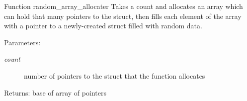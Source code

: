 Function random\_\-array\_\-allocater Takes a count and allocates an array which can hold that many pointers to the struct, then fills each element of the array with a pointer to a newly-created struct filled with random data. \begin{Desc}
\item[Parameters:]
\begin{description}
\item[{\em count}]number of pointers to the struct that the function allocates \end{description}
\end{Desc}
\begin{Desc}
\item[Returns:]base of array of pointers \end{Desc}
